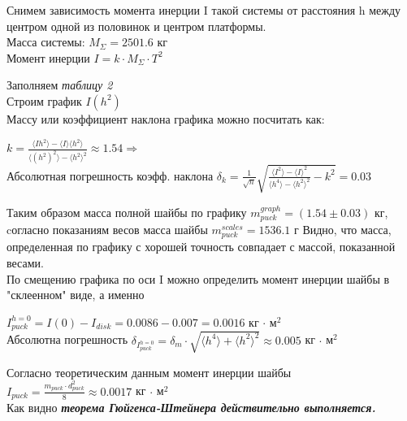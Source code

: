 \documentclass[10px]{article}
\begin{document}
Снимем зависимость момента инерции I такой 
системы от расстояния h между центром одной из половинок и центром платформы.\\
Масса системы: $M_{\Sigma} = 2501.6$ кг\\
Момент инерции $I = k \cdot M_{\Sigma} \cdot T^2$\\

\begin{minipage}[h]{0.5\linewidth}
Заполняем \textit{таблицу 2} \\
Строим график $I(h^2)$\\
Массу или коэффициент наклона графика можно посчитать как: 
\begin{center}
    $k = \frac{\langle I h^2 \rangle - \langle I \rangle \langle h^2 \rangle}{\langle (h^2)^2 \rangle - \langle h^2 \rangle^2} \approx 1.54 \Rightarrow$ \\
    Абсолютная погрешность коэфф. наклона $\delta_k = \frac{1}{\sqrt{n}} \sqrt{\frac{\langle I^2 \rangle - \langle I \rangle^2}{\langle h^4 \rangle - \langle h^2 \rangle^2} - k^2} = 0.03 $
\end{center}
Таким образом масса полной шайбы по графику $m^{graph}_{puck} = (1.54 \pm 0.03)$ кг, cогласно показаниям весов масса шайбы $m^{scales}_{puck} = 1536.1$ г Видно, что масса, определенная по графику с хорошей точность совпадает с массой, показанной весами.\\
По смещению графика по оси I можно определить момент инерции шайбы в "склеенном" виде, а именно 
\begin{center}
    $I^{h = 0}_{puck} = I(0) - I_{disk} = 0.0086 - 0.007 = 0.0016$ кг $\cdot$ м$^2$ \\
    Абсолютна погрешность $\delta_{I^{h = 0}_{puck}} = \delta_m \cdot \sqrt{\langle h^4 \rangle + \langle h^2 \rangle^2} \approx 0.005$ кг $\cdot$ м$^2$
\end{center}

Согласно теоретическим данным момент инерции шайбы $I_{puck} = 
\frac{m_{puck}\cdot d_{puck}^2}{8} \approx 0.0017$ кг $\cdot$ м$^2$ \\
Как видно \textit{\textbf{теорема Гюйгенса-Штейнера действительно выполняется.}}
\end{minipage}
\end{document}
